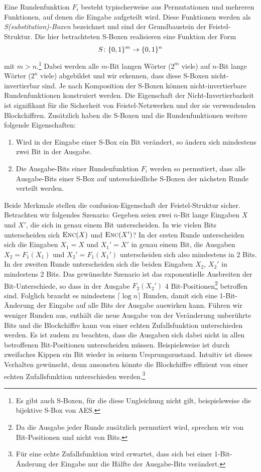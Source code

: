 Eine Rundenfunktion \(F_i\) besteht typischerweise aus Permutationen und
mehreren Funktionen, auf denen die Eingabe aufgeteilt wird. Diese
Funktionen werden als \textit{S(substitution)-Boxen} \indexSBOX
bezeichnet und sind der Grundbaustein der Feistel-Struktur. Die hier
betrachteten S-Boxen realisieren eine Funktion der Form 
\begin{align*}
  S \colon \{0, 1\}^m \rightarrow \{0, 1\}^n
\end{align*}
mit \(m > n\).\footnote{Es gibt auch S-Boxen, für die diese Ungleichung
  nicht gilt, beispielsweise die bijektive S-Box von AES.} Dabei werden
alle $m$-Bit langen Wörter (\(2^m\) viele) auf $n$-Bit lange Wörter
(\(2^n\) viele) abgebildet und wir erkennen, dass diese S-Boxen
nicht-invertierbar sind. Je nach Komposition der S-Boxen können
nicht-invertierbare Rundenfunktionen konstruiert werden. Die Eigenschaft
der Nicht-Invertierbarkeit ist signifikant für die Sicherheit von
Feistel-Netzwerken und der sie verwendenden Blockchiffren. Zusätzlich
haben die S-Boxen und die Rundenfunktionen weitere folgende
Eigenschaften: 
\begin{enumerate}
\item Wird in der Eingabe einer S-Box ein Bit verändert, so ändern sich
  mindestens zwei Bit in der Ausgabe. 
\item Die Ausgabe-Bits einer Rundenfunktion $F_i$ werden so permutiert,
  dass alle Ausgabe-Bits einer S-Box auf unterschiedliche S-Boxen der
  nächsten Runde verteilt werden. 
\end{enumerate}
Beide Merkmale stellen die confusion-Eigenschaft der Feistel-Struktur sicher. 
Betrachten wir folgendes Szenario: Gegeben seien zwei $n$-Bit lange
Eingaben $X$ und $X'$, die sich in genau einem Bit unterscheiden. In wie
vielen Bits unterscheiden sich $\textsc{Enc}(X)$ und $\textsc{Enc}(X')$? In der ersten
Runde unterscheiden sich die Eingaben $X_1 = X$ und $X_1' = X'$ in genau
einem Bit, die Ausgaben $X_2 = F_1(X_1)$ und $X_2' = F_1(X_1')$
unterscheiden sich also mindestens in 2 Bits. In der zweiten Runde
unterscheiden sich die beiden Eingaben $X_2$, $X_2'$ in mindestens 2
Bits. Das gewünschte Szenario ist das exponentielle Ausbreiten der
Bit-Unterschiede, so dass in der Ausgabe $F_2(X_2')$ 4
Bit-Positionen\footnote{Da die Ausgabe jeder Runde zusätzlich permutiert
  wird, sprechen wir von Bit-Positionen und nicht von Bits.} betroffen
sind. Folglich braucht es mindestens $\lceil \log n \rceil$ Runden,
damit sich eine 1-Bit-Änderung der Eingabe auf alle Bits der Ausgabe
auswirken kann. Führen wir weniger Runden aus, enthält die neue Ausgabe
von der Veränderung unberührte Bits und die Blockchiffre kann von einer
echten Zufallsfunktion unterschieden werden. Es ist zudem zu beachten,
dass die Ausgaben sich dabei nicht in allen betroffenen Bit-Positionen
unterscheiden müssen. Beispielsweise ist durch zweifaches Kippen ein Bit
wieder in seinem Ursprungszustand. Intuitiv ist dieses Verhalten
gewünscht, denn ansonsten könnte die Blockchiffre effizient von einer
echten Zufallsfunktion unterschieden werden.\footnote{Für eine echte
  Zufallsfunktion wird erwartet, dass sich bei einer 1-Bit-Änderung der
  Eingabe nur die Hälfte der Ausgabe-Bits verändert.} 


